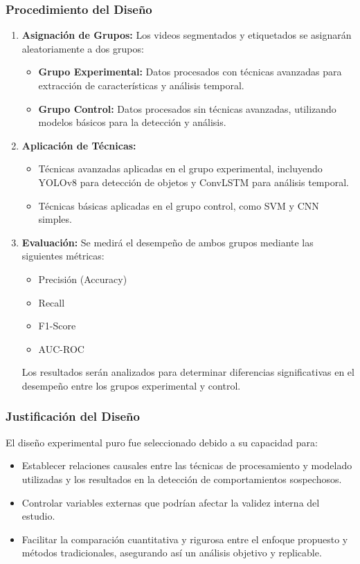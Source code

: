 \documentclass[listof=nochaptergap,12pt,times,authoryear]{report}
\begin{document}
\subsubsection{Procedimiento del Diseño}
\begin{enumerate}
    \item \textbf{Asignación de Grupos:} 
    Los videos segmentados y etiquetados se asignarán aleatoriamente a dos grupos:
    \begin{itemize}
        \item \textbf{Grupo Experimental:} Datos procesados con técnicas avanzadas para extracción de características y análisis temporal.
        \item \textbf{Grupo Control:} Datos procesados sin técnicas avanzadas, utilizando modelos básicos para la detección y análisis.
    \end{itemize}
    \item \textbf{Aplicación de Técnicas:}
    \begin{itemize}
        \item Técnicas avanzadas aplicadas en el grupo experimental, incluyendo YOLOv8 para detección de objetos y ConvLSTM para análisis temporal.
        \item Técnicas básicas aplicadas en el grupo control, como SVM y CNN simples.
    \end{itemize}
    \item \textbf{Evaluación:} 
    Se medirá el desempeño de ambos grupos mediante las siguientes métricas:
    \begin{itemize}
        \item Precisión (Accuracy)
        \item Recall
        \item F1-Score
        \item AUC-ROC
    \end{itemize}
    Los resultados serán analizados para determinar diferencias significativas en el desempeño entre los grupos experimental y control.
\end{enumerate}

\subsubsection{Justificación del Diseño}
El diseño experimental puro fue seleccionado debido a su capacidad para:
\begin{itemize}
    \item Establecer relaciones causales entre las técnicas de procesamiento y modelado utilizadas y los resultados en la detección de comportamientos sospechosos.
    \item Controlar variables externas que podrían afectar la validez interna del estudio.
    \item Facilitar la comparación cuantitativa y rigurosa entre el enfoque propuesto y métodos tradicionales, asegurando así un análisis objetivo y replicable.
\end{itemize}
\end{document}
